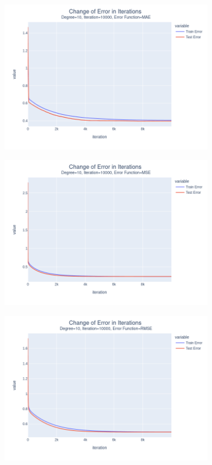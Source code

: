 \documentclass[14pt,a4]{article}
\begin{document}
\begin{figure}[h]
\begin{subfigure}{0.3\linewidth}
        \includegraphics[width=\textwidth]{images/implementation/q1/part_d/error/10_10000_MAE.png}
    \end{subfigure}
    \hfill
    \begin{subfigure}{0.3\textwidth}
        \centering
        \includegraphics[width=\textwidth]{images/implementation/q1/part_d/error/10_10000_MSE.png}
    \end{subfigure}
    \hfill
    \begin{subfigure}{0.3\linewidth}
        \centering
        \includegraphics[width=\textwidth]{images/implementation/q1/part_d/error/10_10000_RMSE.png}

\end{subfigure}
\end{figure}
\end{document}
